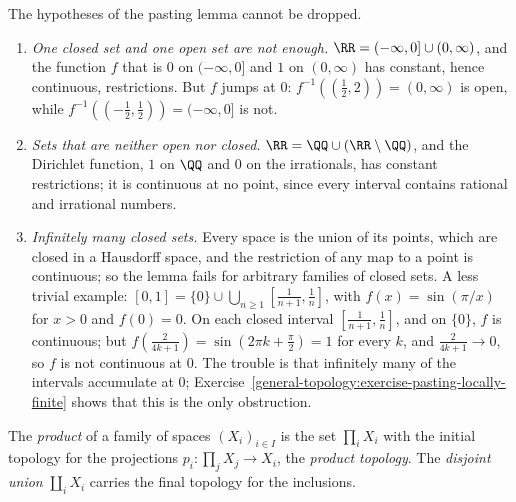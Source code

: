 \begin{counterexample}\label{general-topology:counterexample-pasting}
The hypotheses of the pasting lemma cannot be dropped.
\begin{enumerate}
\item \emph{One closed set and one open set are not enough.} $\RR = (-\infty, 0] \cup (0, \infty)$, and the function $f$ that is $0$ on $(-\infty, 0]$ and $1$ on $(0, \infty)$ has constant, hence continuous,
restrictions. But $f$ jumps at $0$: $f^{-1}((\frac12, 2)) = (0, \infty)$ is open, while $f^{-1}((-\frac12, \frac12)) = (-\infty, 0]$ is not.
\item \emph{Sets that are neither open nor closed.} $\RR = \QQ \cup (\RR \setminus \QQ)$, and the Dirichlet function, $1$ on $\QQ$ and $0$ on the irrationals, has constant restrictions; it is continuous at no point,
since every interval contains rational and irrational numbers.
\item \emph{Infinitely many closed sets.} Every space is the union of its points, which are closed in a Hausdorff space, and the restriction of any map to a point is continuous; so the lemma fails for arbitrary families
of closed sets. A less trivial example: $[0, 1] = \{0\} \cup \bigcup_{n \geq 1}[\frac{1}{n+1}, \frac1n]$, with $f(x) = \sin(\pi/x)$ for $x > 0$ and $f(0) = 0$. On each closed interval $[\frac{1}{n+1}, \frac1n]$, and on
$\{0\}$, $f$ is continuous; but $f(\frac{2}{4k+1}) = \sin(2\pi k + \frac\pi2) = 1$ for every $k$, and $\frac{2}{4k+1} \to 0$, so $f$ is not continuous at $0$. The trouble is that infinitely many of the intervals
accumulate at $0$; Exercise~\ref{general-topology:exercise-pasting-locally-finite} shows that this is the only obstruction.
\end{enumerate}
\end{counterexample}

\begin{definition}\label{general-topology:definition-product}
The \emph{product} of a family of spaces $(X_i)_{i \in I}$ is the set $\prod_i X_i$ with the initial topology for the projections
$p_i \colon \prod_j X_j \to X_i$, the \emph{product topology}. The \emph{disjoint union} $\coprod_i X_i$ carries the final topology for the
inclusions.
\end{definition}

